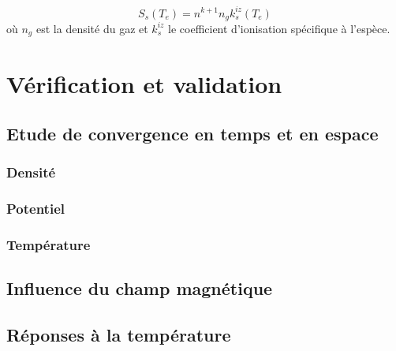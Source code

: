 \begin{refsection}
\begin{equation}
S_s(T_e)=n^{k+1}n_gk_{s}^{iz}(T_e)
\end{equation}
où $n_g$ est la densité du gaz et $k_{s}^{iz}$ le coefficient d'ionisation spécifique à l'espèce.
\cite{Hemsworth}

\section{Vérification et validation}

\subsection{Etude de convergence en temps et en espace}
\subsubsection{Densité}
\subsubsection{Potentiel}
\subsubsection{Température}
\subsection{Influence du champ magnétique}
\subsection{Réponses à la température}

%
%
\end{refsection}

